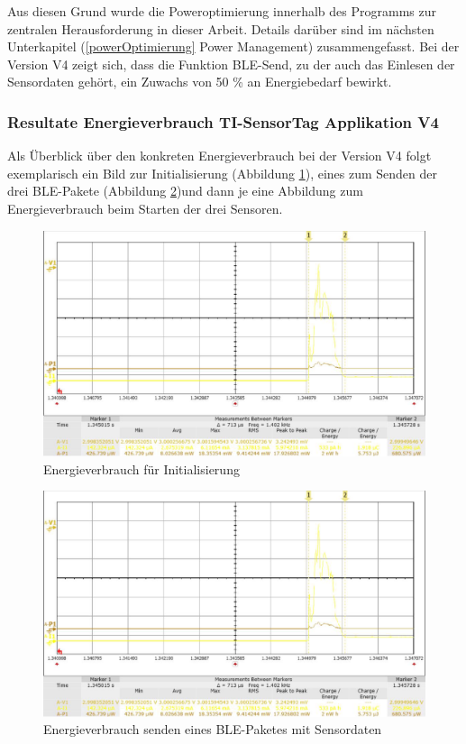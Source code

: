Aus diesen Grund wurde die Poweroptimierung innerhalb des Programms zur zentralen Herausforderung in dieser Arbeit. Details darüber sind im nächsten Unterkapitel (\ref{powerOptimierung} Power Management) zusammengefasst. Bei der Version V4 zeigt sich, dass die Funktion BLE-Send, zu der auch das Einlesen der Sensordaten gehört, ein Zuwachs von 50 \% an Energiebedarf bewirkt. 



\subsubsection{Resultate Energieverbrauch TI-SensorTag Applikation V4}
\label{energie senosortag} 

Als Überblick über den konkreten Energieverbrauch bei der Version V4 folgt exemplarisch ein Bild zur Initialisierung (Abbildung \ref{energie_init}), eines zum Senden der drei BLE-Pakete (Abbildung \ref{energie_senden})und dann je eine Abbildung zum Energieverbrauch beim Starten der drei Sensoren.

\begin{figure}[ht]
  \includegraphics[width=1.0\textwidth]{3Vorgehen/imag/Drucksensor.png}
  \caption{Energieverbrauch für Initialisierung}
  \label{energie_init}
\end{figure}

\begin{figure}[ht]
  \includegraphics[width=1.0\textwidth]{3Vorgehen/imag/Drucksensor.png}
  \caption{Energieverbrauch senden eines BLE-Paketes mit Sensordaten}
  \label{energie_senden}
\end{figure}


